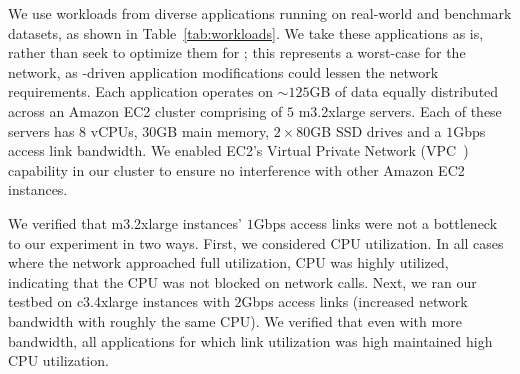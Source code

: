 We use workloads from diverse applications running on real-world and benchmark datasets, as shown in Table~\ref{tab:workloads}. We take these applications as is, rather than seek to optimize them for \dis; this represents a worst-case for the network, as \dis-driven application modifications could lessen the network requirements. %
Each application operates on $\sim125$GB of data equally distributed across an Amazon EC2 cluster comprising of $5$ m3.2xlarge servers. Each of these servers has $8$ vCPUs, $30$GB main memory, $2 \times 80$GB SSD drives and a $1$Gbps access link bandwidth.
We enabled EC2's Virtual Private Network (VPC~\cite{vpc}) capability in our cluster to ensure no interference with other Amazon EC2 instances. 
 
We verified that m3.2xlarge instances' $1$Gbps access links were not a bottleneck to our experiment in two ways. 
First, we considered CPU utilization. In all cases where the network approached full utilization, CPU was highly utilized, indicating that the CPU was not blocked on network calls. 
Next, we ran our testbed on c3.4xlarge instances with $2$Gbps access links (increased network bandwidth with roughly the same CPU). We verified that even with more bandwidth, all applications for which link utilization was high maintained high CPU utilization. 

